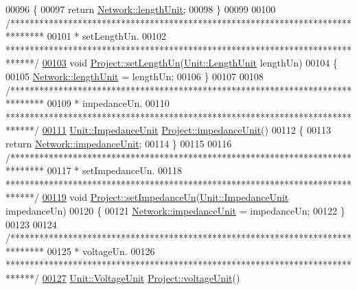 \begin{DoxyCode}
00096 \{
00097   \textcolor{keywordflow}{return} \hyperlink{group___graphics_gae46c0e2bf39b343875e3c69066fe2652}{Network::lengthUnit};
00098 \}
00099 
00100 \textcolor{comment}{/*******************************************************************************}
00101 \textcolor{comment}{ * setLengthUn.}
00102 \textcolor{comment}{ ******************************************************************************/}
\hypertarget{project_8cpp_source_l00103}{}\hyperlink{class_project_a846ee2284b0856d461b35d78d9f8e1d6}{00103} \textcolor{keywordtype}{void} \hyperlink{class_project_a846ee2284b0856d461b35d78d9f8e1d6}{Project::setLengthUn}(\hyperlink{class_unit_a8c8921f7b225ad6063b1cb573425b9a0}{Unit::LengthUnit} lengthUn)
00104 \{
00105   \hyperlink{group___graphics_gae46c0e2bf39b343875e3c69066fe2652}{Network::lengthUnit} = lengthUn;
00106 \}
00107 
00108 \textcolor{comment}{/*******************************************************************************}
00109 \textcolor{comment}{ * impedanceUn.}
00110 \textcolor{comment}{ ******************************************************************************/}
\hypertarget{project_8cpp_source_l00111}{}\hyperlink{class_project_ad0725b9aa4445dd6d21d4e15df482d3b}{00111} \hyperlink{class_unit_a3747e779c805df24a71961290be3fbdf}{Unit::ImpedanceUnit} \hyperlink{class_project_ad0725b9aa4445dd6d21d4e15df482d3b}{Project::impedanceUnit}()
00112 \{
00113   \textcolor{keywordflow}{return} \hyperlink{group___graphics_ga5f3d72699a723c64a89d22e34df708ff}{Network::impedanceUnit};
00114 \}
00115 
00116 \textcolor{comment}{/*******************************************************************************}
00117 \textcolor{comment}{ * setImpedanceUn.}
00118 \textcolor{comment}{ ******************************************************************************/}
\hypertarget{project_8cpp_source_l00119}{}\hyperlink{class_project_a995d050781923522ae2a02728346d199}{00119} \textcolor{keywordtype}{void} \hyperlink{class_project_a995d050781923522ae2a02728346d199}{Project::setImpedanceUn}(\hyperlink{class_unit_a3747e779c805df24a71961290be3fbdf}{Unit::ImpedanceUnit} impedanceUn)
00120 \{
00121   \hyperlink{group___graphics_ga5f3d72699a723c64a89d22e34df708ff}{Network::impedanceUnit} = impedanceUn;
00122 \}
00123 
00124 \textcolor{comment}{/*******************************************************************************}
00125 \textcolor{comment}{ * voltageUn.}
00126 \textcolor{comment}{ ******************************************************************************/}
\hypertarget{project_8cpp_source_l00127}{}\hyperlink{class_project_a93b928093072ba15c24693b03a934e4e}{00127} \hyperlink{class_unit_a55b07dfa9457e1eca2c7194fe0cfc3c1}{Unit::VoltageUnit} \hyperlink{class_project_a93b928093072ba15c24693b03a934e4e}{Project::voltageUnit}()

\end{DoxyCode}
